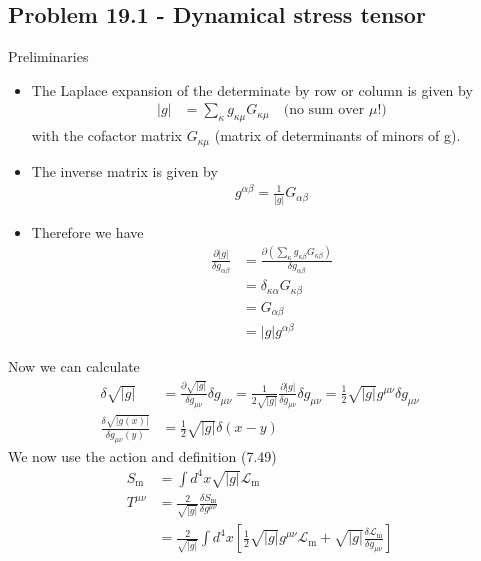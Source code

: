 \documentclass[../main.tex]{subfiles}
\begin{document}
\subsection{Problem 19.1 - Dynamical stress tensor}
Preliminaries
\begin{itemize} 
\item The Laplace expansion of the determinate by row or column is given by
\begin{align}
    |g|&=\sum_\kappa g_{\kappa\mu}G_{\kappa\mu}\quad\text{(no sum over $\mu$!)}
\end{align}
with the cofactor matrix $G_{\kappa\mu}$ (matrix of determinants of minors of g).
\item The inverse matrix is given by
\begin{align}
    g^{\alpha\beta}=\frac{1}{|g|}G_{\alpha\beta}
\end{align}
\item Therefore we have
\begin{align}
    \frac{\partial|g|}{\delta g_{\alpha\beta}}
    &=\frac{\partial\left(\sum_\kappa g_{\kappa\beta}G_{\kappa\beta}\right)}{\delta g_{\alpha\beta}}\\
    &=\delta_{\kappa\alpha}G_{\kappa\beta}\\
    &=G_{\alpha\beta}\\
    &=|g|g^{\alpha\beta}
\end{align}
\end{itemize}
Now we can calculate
\begin{align}
    \delta\sqrt{|g|}
    &=\frac{\partial\sqrt{|g|}}{\delta g_{\mu\nu}}\delta g_{\mu\nu}
    =\frac{1}{2\sqrt{|g|}}\frac{\partial|g|}{\delta g_{\mu\nu}}\delta g_{\mu\nu}
    =\frac{1}{2}\sqrt{|g|}g^{\mu\nu}\delta g_{\mu\nu}\\
    \frac{\delta\sqrt{|g(x)|}}{\delta g_{\mu\nu}(y)}
    &=\frac{1}{2}\sqrt{|g|}\delta(x-y)
\end{align}
We now use the action and definition (7.49)
\begin{align}
    S_\text{m}&=\int d^4x\sqrt{|g|}\mathscr{L}_\text{m}\\
    T^{\mu\nu}&=\frac{2}{\sqrt{|g|}}\frac{\delta S_\text{m}}{\delta g^{\mu\nu}}\\
    &=\frac{2}{\sqrt{|g|}}\int d^4x\left[\frac{1}{2}\sqrt{|g|}g^{\mu\nu}\mathscr{L}_\text{m}+\sqrt{|g|}\frac{\delta\mathscr{L}_\text{m}}{\delta g_{\mu\nu}}\right]
\end{align}
\end{document}
